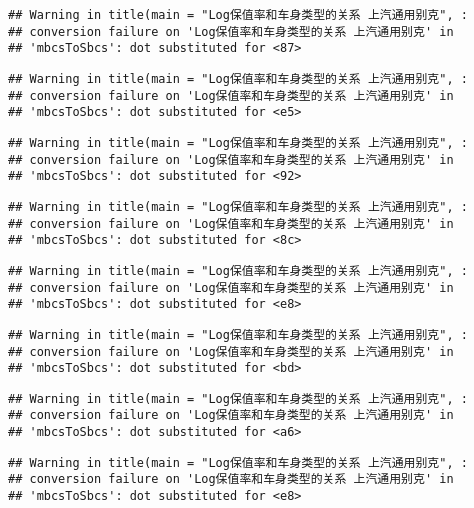 \documentclass[]{article}
\begin{document}
\begin{verbatim}
## Warning in title(main = "Log保值率和车身类型的关系 上汽通用别克", :
## conversion failure on 'Log保值率和车身类型的关系 上汽通用别克' in
## 'mbcsToSbcs': dot substituted for <87>
\end{verbatim}

\begin{verbatim}
## Warning in title(main = "Log保值率和车身类型的关系 上汽通用别克", :
## conversion failure on 'Log保值率和车身类型的关系 上汽通用别克' in
## 'mbcsToSbcs': dot substituted for <e5>
\end{verbatim}

\begin{verbatim}
## Warning in title(main = "Log保值率和车身类型的关系 上汽通用别克", :
## conversion failure on 'Log保值率和车身类型的关系 上汽通用别克' in
## 'mbcsToSbcs': dot substituted for <92>
\end{verbatim}

\begin{verbatim}
## Warning in title(main = "Log保值率和车身类型的关系 上汽通用别克", :
## conversion failure on 'Log保值率和车身类型的关系 上汽通用别克' in
## 'mbcsToSbcs': dot substituted for <8c>
\end{verbatim}

\begin{verbatim}
## Warning in title(main = "Log保值率和车身类型的关系 上汽通用别克", :
## conversion failure on 'Log保值率和车身类型的关系 上汽通用别克' in
## 'mbcsToSbcs': dot substituted for <e8>
\end{verbatim}

\begin{verbatim}
## Warning in title(main = "Log保值率和车身类型的关系 上汽通用别克", :
## conversion failure on 'Log保值率和车身类型的关系 上汽通用别克' in
## 'mbcsToSbcs': dot substituted for <bd>
\end{verbatim}

\begin{verbatim}
## Warning in title(main = "Log保值率和车身类型的关系 上汽通用别克", :
## conversion failure on 'Log保值率和车身类型的关系 上汽通用别克' in
## 'mbcsToSbcs': dot substituted for <a6>
\end{verbatim}

\begin{verbatim}
## Warning in title(main = "Log保值率和车身类型的关系 上汽通用别克", :
## conversion failure on 'Log保值率和车身类型的关系 上汽通用别克' in
## 'mbcsToSbcs': dot substituted for <e8>
\end{verbatim}
\end{document}

